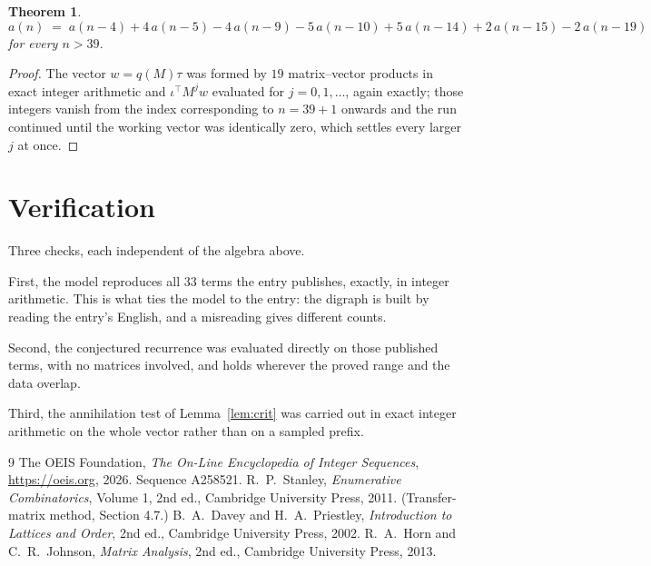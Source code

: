 \documentclass[11pt,a4paper]{article}
\theoremstyle{plain}
\newtheorem{theorem}{Theorem}
\theoremstyle{definition}
\begin{document}
\begin{theorem}
\[
a(n)\;=\;a(n-4) + 4\,a(n-5) - 4\,a(n-9) - 5\,a(n-10) + 5\,a(n-14) + 2\,a(n-15) - 2\,a(n-19)
\]
for every $n>39$.
\end{theorem}

\begin{proof}
The vector $w=q(M)\tau$ was formed by $19$ matrix--vector products in exact integer
arithmetic and $\iota^{\!\top}M^{j}w$ evaluated for $j=0,1,\dots$, again exactly; those
integers vanish from the index corresponding to $n=39+1$ onwards and the run continued
until the working vector was identically zero, which settles every larger $j$ at once.
\end{proof}

\section{Verification}

Three checks, each independent of the algebra above.

First, the model reproduces all $33$ terms the entry publishes, exactly, in integer
arithmetic. This is what ties the model to the entry: the digraph is built by reading the
entry's English, and a misreading gives different counts.

Second, the conjectured recurrence was evaluated directly on those published terms, with no
matrices involved, and holds wherever the proved range and the data overlap.

Third, the annihilation test of Lemma~\ref{lem:crit} was carried out in exact integer
arithmetic on the whole vector rather than on a sampled prefix.

\begin{thebibliography}{9}
 The OEIS Foundation, \emph{The On-Line Encyclopedia of Integer
Sequences}, \url{https://oeis.org}, 2026. Sequence A258521.
 R.~P.~Stanley, \emph{Enumerative Combinatorics}, Volume 1, 2nd ed.,
Cambridge University Press, 2011. (Transfer-matrix method, Section 4.7.)
 B.~A.~Davey and H.~A.~Priestley, \emph{Introduction to Lattices and
Order}, 2nd ed., Cambridge University Press, 2002.
 R.~A.~Horn and C.~R.~Johnson, \emph{Matrix Analysis}, 2nd ed., Cambridge
University Press, 2013.
\end{thebibliography}
\end{document}
